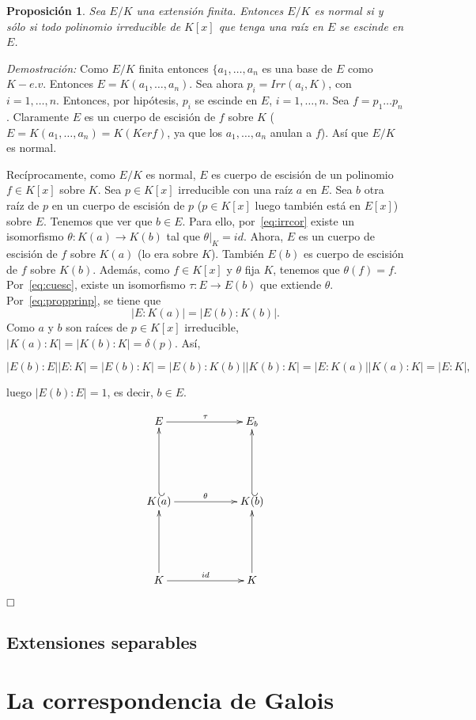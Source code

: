 \documentclass[12pt]{article}
\newtheorem{proposition}[theorem]{Proposición}
\begin{document}
\begin{proposition}\label{eq:extnou} Sea $E/K$ una extensión finita. Entonces $E/K$ es normal si y sólo si todo polinomio irreducible de $K[x]$ que tenga una raíz en $E$ se escinde en $E$.
\end{proposition}
\emph{Demostración: } Como $E/K$ finita entonces $\lbrace a_{1}, \ldots, a_{n}$ es una base de $E$ como $K-e.v$. Entonces $E= K(a_{1}, \ldots, a_{n})$. Sea ahora $p_{i} = Irr(a_{i}, K)$, con $i = 1, \ldots, n$. Entonces, por hipótesis, $p_{i}$ se escinde en $E$, $i = 1, \ldots , n$. Sea $f = p_{1} \ldots p_{n}$. Claramente $E$ es un cuerpo de escisión de $f$ sobre $K$ ($E= K(a_{1}, \ldots, a_{n}) = K(Kerf)$, ya que los $a_{1}, \ldots, a_{n}$ anulan a $f$). Así que $E/K$ es normal.

Recíprocamente, como $E/K$ es normal, $E$ es cuerpo de escisión de un polinomio $f \in K[x]$ sobre $K$. Sea $p \in K[x]$ irreducible con una raíz $a$ en $E$. Sea $b$ otra raíz de $p$ en un cuerpo de escisión de $p$ ($p \in K[x]$ luego también está en $E[x]$) sobre $E$. Tenemos que ver que $b \in E$. Para ello, por~\ref{eq:irrcor} existe un isomorfismo $\theta \colon K(a) \longrightarrow K(b)$ tal que $\left.\theta \right|_K  = id$. Ahora, $E$ es un cuerpo de escisión de $f$ sobre $K(a)$ (lo era sobre $K$). También $E(b)$ es cuerpo de escisión de $f$ sobre $K(b)$. Además, como $f \in K[x]$ y $\theta$ fija $K$, tenemos que $\theta (f) = f$. Por~\ref{eq:cuesc}, existe un isomorfismo $\tau \colon E \longrightarrow E(b)$ que extiende $\theta$. Por~\ref{eq:propprinp}, se tiene que $$|E:K(a)| = |E(b) :K(b)|.$$ Como $a$ y $b$ son raíces de $p \in K[x]$ irreducible, $|K(a) :K| = |K(b) : K| = \delta (p)$. Así, \begin{center}$|E(b) : E| |E: K| = |E(b): K| = |E(b) :K(b)| |K(b):K| = |E:K(a)| |K(a) :K| = |E:K|,$\end{center} luego $|E(b) :E| = 1$, es decir, $b \in E$.

$$\xymatrix @=2cm {E\ar[r]^{\tau} & E_{b} \\ K(a)\ar[r]^{\theta} \ar@{_(->}[u] & K(b) \ar@{_(->}[u] \\ K \ar[r]^{id} \ar[u] & K \ar[u]  }$$

$\hfill \square$

\subsection{Extensiones separables}

\section{La correspondencia de Galois}
\end{document}
